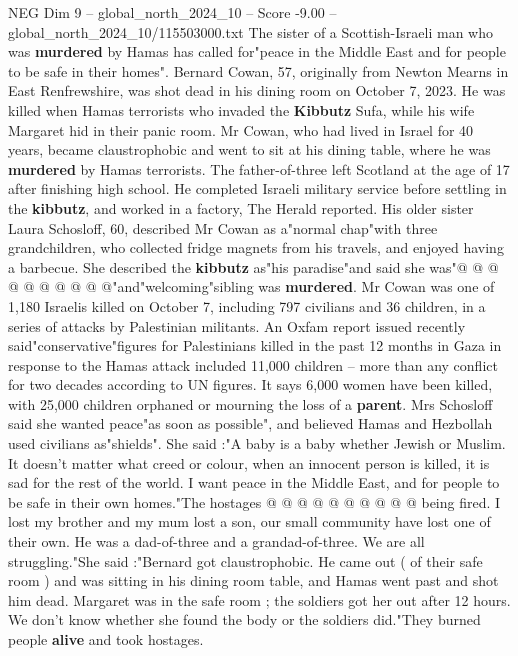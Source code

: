 \begin{textsample}{NEG Dim 9 – global\_north\_2024\_10 – Score -9.00 – global\_north\_2024\_10/115503000.txt}  \label{ex:f9_neg_045}
The sister of a Scottish-Israeli man who was \textbf{murdered} by Hamas has called for"peace in the Middle East and for people to be safe in their homes".
Bernard Cowan, 57, originally from Newton Mearns in East Renfrewshire, was shot dead in his dining room on October 7, 2023.
He was killed when Hamas terrorists who invaded the \textbf{Kibbutz} Sufa, while his wife Margaret hid in their panic room.
Mr Cowan, who had lived in Israel for 40 years, became claustrophobic and went to sit at his dining table, where he was \textbf{murdered} by Hamas terrorists.
The father-of-three left Scotland at the age of 17 after finishing high school.
He completed Israeli military service before settling in the \textbf{kibbutz}, and worked in a factory, The Herald reported.
His older sister Laura Schosloff, 60, described Mr Cowan as a"normal chap"with three grandchildren, who collected fridge magnets from his travels, and enjoyed having a barbecue.
She described the \textbf{kibbutz} as"his paradise"and said she was"@ @ @ @ @ @ @ @ @ @"and"welcoming"sibling was \textbf{murdered}.
Mr Cowan was one of 1,180 Israelis killed on October 7, including 797 civilians and 36 children, in a series of attacks by Palestinian militants.
An Oxfam report issued recently said"conservative"figures for Palestinians killed in the past 12 months in Gaza in response to the Hamas attack included 11,000 children -- more than any conflict for two decades according to UN figures.
It says 6,000 women have been killed, with 25,000 children orphaned or mourning the loss of a \textbf{parent}.
Mrs Schosloff said she wanted peace"as soon as possible", and believed Hamas and Hezbollah used civilians as"shields".
She said :"A baby is a baby whether Jewish or Muslim.
It doesn't matter what creed or colour, when an innocent person is killed, it is sad for the rest of the world.
I want peace in the Middle East, and for people to be safe in their own homes."The hostages @ @ @ @ @ @ @ @ @ @ being fired.
I lost my brother and my mum lost a son, our small community have lost one of their own.
He was a dad-of-three and a grandad-of-three.
We are all struggling."She said :"Bernard got claustrophobic.
He came out ( of their safe room ) and was sitting in his dining room table, and Hamas went past and shot him dead.
Margaret was in the safe room ; the soldiers got her out after 12 hours.
We don't know whether she found the body or the soldiers did."They burned people \textbf{alive} and took hostages.

\end{textsample}
